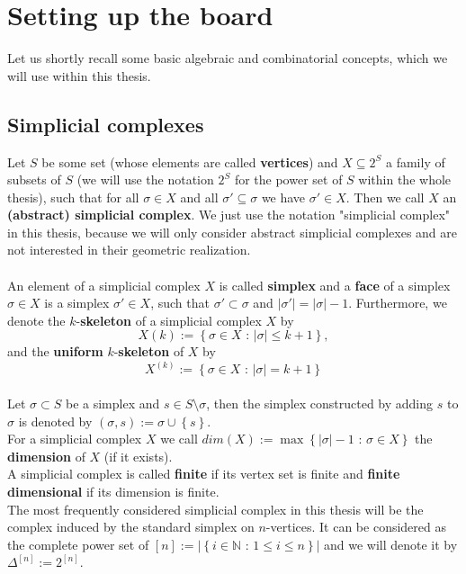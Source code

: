 
\chapter{Setting up the board}

\label{Chapter1}

Let us shortly recall some basic algebraic and combinatorial concepts, which we will use within this thesis.

\section{Simplicial complexes}

Let \(S\) be some set (whose elements are called \textbf{vertices}) and \(X\subseteq 2^S\) a family of subsets of \(S\) (we will use the notation \(2^S\) for the power set of \(S\) within the whole thesis), such that for all \(\sigma\in X\) and all \(\sigma'\subseteq\sigma\) we have \(\sigma'\in X\). Then we call \(X\) an \textbf{(abstract) simplicial complex}. We just use the notation "simplicial complex" in this thesis, because we will only consider abstract simplicial complexes and are not interested in their geometric realization.\\
\\
An element of a simplicial complex \(X\) is called \textbf{simplex} and a \textbf{face} of a simplex \(\sigma\in X\) is a simplex \(\sigma'\in X\), such that \(\sigma'\subset\sigma\) and \(\left|\sigma'\right|=\left|\sigma\right|-1\). Furthermore, we denote the \(k\)-\textbf{skeleton} of a simplicial complex \(X\) by
\[
X(k):=\left\{\sigma\in X\text{ : }\left|\sigma\right|\leq k+1\right\},
\]
and the \textbf{uniform} \(k\)-\textbf{skeleton} of \(X\) by
\[
X^{(k)}:=\left\{\sigma\in X\text{ : }\left|\sigma\right|=k+1\right\}
\]
\\
Let \(\sigma\subset S\) be a simplex and \(s\in S\setminus\sigma\), then the simplex constructed by adding \(s\) to \(\sigma\) is denoted by \((\sigma,s):=\sigma\cup\left\{s\right\}\).\\
For a simplicial complex \(X\) we call \(dim(X):=\max\left\{\left|\sigma\right|-1\text{ : }\sigma\in X\right\}\) the \textbf{dimension} of \(X\) (if it exists).
\\
A simplicial complex is called \textbf{finite} if its vertex set is finite and \textbf{finite dimensional} if its dimension is finite.\\
The most frequently considered simplicial complex in this thesis will be the complex induced by the standard simplex on \(n\)-vertices. It can be considered as the complete power set of \([n]:=\left|\left\{i\in\mathbb{N}\text{ : }1\leq i\leq n\right\}\right|\) and we will denote it by \(\Delta^{[n]}:=2^{[n]}\).

